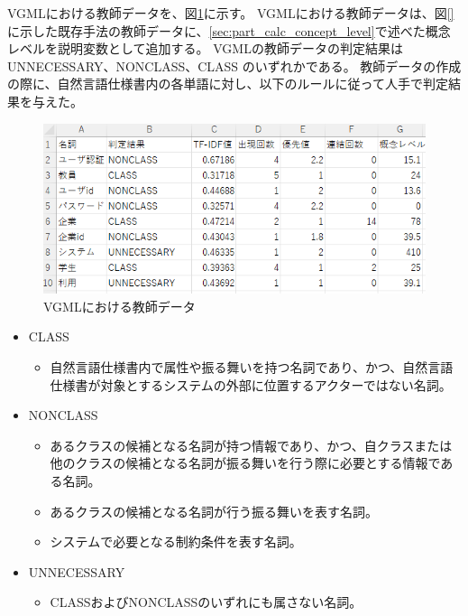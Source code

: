VGMLにおける教師データを、図\ref{fig:vgml_teach}に示す。
VGMLにおける教師データは、図\ref{}に示した既存手法の教師データに、\ref{sec:part_calc_concept_level}で述べた概念レベルを説明変数として追加する。
VGMLの教師データの判定結果はUNNECESSARY、NONCLASS、CLASS のいずれかである。
教師データの作成の際に、自然言語仕様書内の各単語に対し、以下のルールに従って人手で判定結果を与えた。

\begin{figure}[t]
    \begin{center}
        \includegraphics[width=1.0\columnwidth]{image/vgml_teach.png}
        \caption{VGMLにおける教師データ}
        \label{fig:vgml_teach}
    \end{center}
\end{figure}

\begin{itemize}
    \item CLASS
        \begin{itemize}
            \item 自然言語仕様書内で属性や振る舞いを持つ名詞であり、かつ、自然言語仕様書が対象とするシステムの外部に位置するアクターではない名詞。
        \end{itemize}
    \item NONCLASS
        \begin{itemize}
            \item あるクラスの候補となる名詞が持つ情報であり、かつ、自クラスまたは他のクラスの候補となる名詞が振る舞いを行う際に必要とする情報である名詞。
            \item あるクラスの候補となる名詞が行う振る舞いを表す名詞。
            \item システムで必要となる制約条件を表す名詞。
        \end{itemize}
    \item UNNECESSARY
        \begin{itemize}
            \item CLASSおよびNONCLASSのいずれにも属さない名詞。
        \end{itemize}
\end{itemize}

